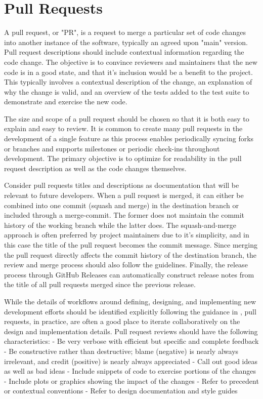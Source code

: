 \documentclass[]{nrel}
\begin{document}
\section{Pull Requests}
A pull request, or "PR", is a request to merge a particular set of code changes into another
instance of the software, typically an agreed upon "main" version.
Pull request descriptions should include contextual information regarding the code change.
The objective is to convince reviewers and maintainers that the new code is in a good state,
and that it's inclusion would be a benefit to the project. This typically involves a contextual
description of the change, an explanation of why the change is valid, and an overview of the
tests added to the test suite to demonstrate and exercise the new code.

The size and scope of a pull request should be chosen so that it is both easy to explain and
easy to review.
It is common to create many pull requests in the development of a single
feature as this process enables periodically syncing forks or branches and supports
milestones or periodic check-ins throughout development.
The primary objective is to optimize for readability in the pull request description as well as
the code changes themselves.

Consider pull requests titles and descriptions as documentation that will be relevant to
future developers.
When a pull request is merged, it can either be combined into one commit (squash and merge)
in the destination branch or included through a merge-commit.
The former does not maintain the commit history of the working branch while the latter does.
The squash-and-merge approach is often preferred by project maintainers due to it's simplicity,
and in this case the title of the pull request becomes the commit message.
Since merging the pull request directly affects the commit history of the destination branch,
the review and merge process should also follow the  guidelines.
Finally, the release process through GitHub Releases can automatically construct
release notes from the title of all pull requests merged since the previous release.

While the details of workflows around defining, designing, and implementing new development
efforts should be identified explicitly following the guidance in , pull requests,
in practice, are often a good place to iterate collaboratively on the design and implementation
details.
Pull request reviews should have the following characteristics:
- Be very verbose with efficient but specific and complete feedback
- Be constructive rather than destructive; blame (negative) is nearly always irrelevant,
    and credit (positive) is nearly always appreciated
- Call out good ideas as well as bad ideas
- Include snippets of code to exercise portions of the changes
- Include plots or graphics showing the impact of the changes
- Refer to precedent or contextual conventions
- Refer to design documentation and style guides
\end{document}

